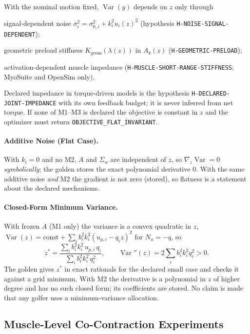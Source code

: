 \documentclass[11pt,a4paper]{article}
\begin{document}
With the nominal motion fixed, $\operatorname{Var}(y)$ depends on $z$ only
through
\begin{description}[leftmargin=*]
\item[M1] signal-dependent noise
$\sigma_i^2=\sigma_{0,i}^2+k_i^2u_i(z)^2$ (hypothesis
\texttt{H-NOISE-SIGNAL-DEPENDENT});
\item[M2] geometric preload stiffness $K_{\mathrm{geom}}(\lambda(z))$ in
$A_k(z)$ (\texttt{H-GEOMETRIC-PRELOAD});
\item[M3] activation-dependent muscle impedance (\texttt{H-MUSCLE-SHORT-RANGE-STIFFNESS};
MyoSuite and OpenSim only).
\end{description}
Declared impedance in torque-driven models is the hypothesis
\texttt{H-DECLARED-JOINT-IMPEDANCE} with its own feedback budget; it is never
inferred from net torque.  If none of M1--M3 is declared the objective is
constant in $z$ and the optimizer must return \texttt{OBJECTIVE\_FLAT\_INVARIANT}.

\paragraph{Additive Noise (Flat Case).}  With $k_i=0$ and no M2, $A$ and
$\Sigma_w$ are independent of $z$, so $\nabla_z\operatorname{Var}=0$
\emph{symbolically}; the golden stores the exact polynomial derivative $0$.
With the same additive noise \emph{and} M2 the gradient is not zero (stored),
so flatness is a statement about the declared mechanisms.

\paragraph{Closed-Form Minimum Variance.}  With frozen $A$ (M1 only) the
variance is a convex quadratic in $z$,
$\operatorname{Var}(z)=\mathrm{const}+\sum_ib_i^2k_i^2(u_{p,i}-q_iz)^2$ for
$N_u=-q$, so
\begin{equation}
z^*=\frac{\sum_ib_i^2k_i^2\,u_{p,i}\,q_i}{\sum_ib_i^2k_i^2\,q_i^2},
\qquad \operatorname{Var}''(z)=2\sum_ib_i^2k_i^2q_i^2>0 .
\end{equation}
The golden gives $z^*$ in exact rationals for the declared small case and
checks it against a grid minimum.  With M2 the derivative is a polynomial in
$z$ of higher degree and has no such closed form; its coefficients are stored.
No claim is made that any golfer uses a minimum-variance allocation.

\subsection{Muscle-Level Co-Contraction Experiments}
\label{sec:var-muscle}
\end{document}
